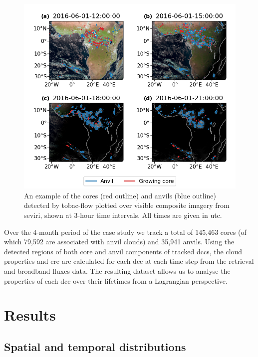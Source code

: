 \documentclass[acp, manuscript]{copernicus}
\begin{document}
\begin{figure}[tp]
    \includegraphics[width=12cm]{figures/fig04.png}
    \caption[
    An example of the cores and anvils (detected by tobac-flow, shown at 3-hour time intervals
    ]{
    An example of the cores (red outline) and anvils (blue outline) detected by tobac-flow plotted over visible composite imagery from \acrshort{seviri}, shown at 3-hour time intervals. All times are given in \acrshort{utc}.
    }
    \label{fig:seviri_detection}
\end{figure}


Over the 4-month period of the case study we track a total of 145,463 cores (of which 79,592 are associated with anvil clouds) and 35,941 anvils. 
Using the detected regions of both core and anvil components of tracked \acrshort{dcc}s, the cloud properties and \acrshort{cre} are calculated for each \acrshort{dcc} at each time step from the retrieval and broadband fluxes data. 
The resulting dataset allows us to analyse the properties of each \acrshort{dcc} over their lifetimes from a Lagrangian perspective.

\section{Results}

\subsection{Spatial and temporal distributions}
\end{document}
